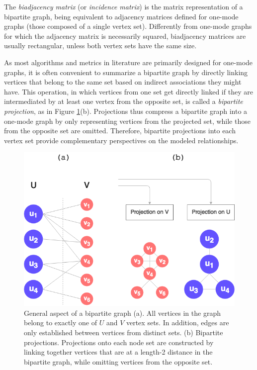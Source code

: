 The \textit{biadjacency matrix} (or \textit{incidence matrix}) is the matrix representation of a bipartite graph, being equivalent to adjacency matrices defined for one-mode graphs (those composed of a single vertex set). 
Differently from one-mode graphs for which the adjacency matrix is necessarily squared, biadjacency matrices are usually rectangular, unless both vertex sets have the same size.

As most algorithms and metrics in literature are primarily designed for one-mode graphs, it is often convenient to summarize a bipartite graph by directly linking vertices that belong to the same set based on indirect associations they might have. 
This operation, in which vertices from one set get directly linked if they are intermediated by at least one vertex from the opposite set, is called a \textit{bipartite projection}, as in Figure \ref{fig:bipartite_general}(b).
Projections thus compress a bipartite graph into a one-mode graph by only representing vertices from the projected set, while those from the opposite set are omitted.
Therefore, bipartite projections into each vertex set provide complementary perspectives on the modeled relationships.
%

\begin{figure}[h!]
  	\centering
    \includegraphics[width=0.5\linewidth]{figures/bipartite_general.png}
    \caption[General aspect of bipartite graphs and their projections.]{General aspect of a bipartite graph (a). All vertices in the graph belong to exactly one of $U$ and $V$ vertex sets. In addition, edges are only established between vertices from distinct sets. (b) Bipartite projections. Projections onto each node set are constructed by linking together vertices that are at a length-2 distance in the bipartite graph, while omitting vertices from the opposite set.}
    \label{fig:bipartite_general}
  \end{figure}


